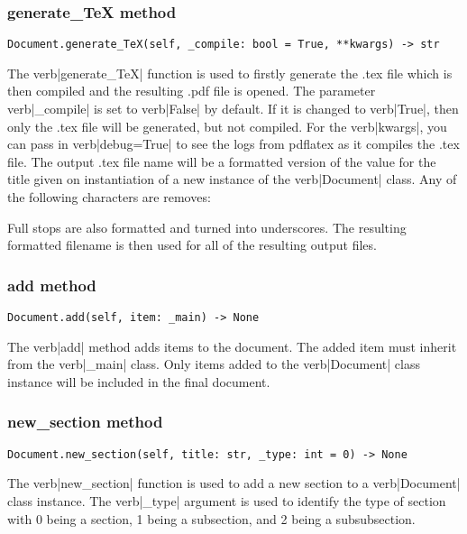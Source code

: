 \documentclass{article}
\begin{document}
\subsubsection{generate\_TeX method}\label{subsubsec:generate_tex_method}
\begin{verbatim}
Document.generate_TeX(self, _compile: bool = True, **kwargs) -> str
\end{verbatim}
The verb|generate_TeX| function is used to firstly generate the .tex file which is then compiled and the resulting .pdf file is opened. The parameter verb|_compile| is set to verb|False| by default. If it is changed to verb|True|, then only the .tex file will be generated, but not compiled. For the verb|kwargs|, you can pass in verb|debug=True| to see the logs from pdflatex as it compiles the .tex file.
The output .tex file name will be a formatted version of the value for the title given on instantiation of a new instance of the verb|Document| class. Any of the following characters are removes:
Full stops are also formatted and turned into underscores. The resulting formatted filename is then used for all of the resulting output files.
\subsubsection{add method}\label{subsubsec:add_method}
\begin{verbatim}
Document.add(self, item: _main) -> None
\end{verbatim}
The verb|add| method adds items to the document. The added item must inherit from the verb|_main| class. Only items added to the verb|Document| class instance will be included in the final document.
\subsubsection{new\_section method}\label{subsubsec:new_section_method}
\begin{verbatim}
Document.new_section(self, title: str, _type: int = 0) -> None
\end{verbatim}
The verb|new_section| function is used to add a new section to a verb|Document| class instance. The verb|_type| argument is used to identify the type of section with 0 being a section, 1 being a subsection, and 2 being a subsubsection.
\end{document}
